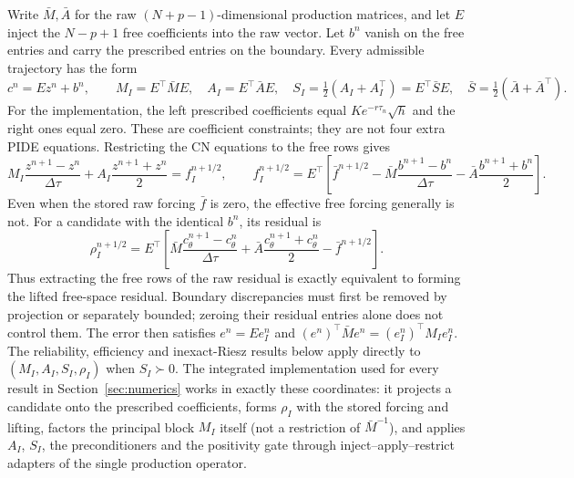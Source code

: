 \documentclass[11pt]{amsart}
\theoremstyle{remark}
\begin{document}
Write $\bar M,\bar A$ for the raw $(N+p-1)$-dimensional production matrices,
and let $E$ inject the $N-p+1$ free coefficients into the raw vector.
Let $b^n$ vanish on the free entries and carry the prescribed entries on the
boundary. Every admissible trajectory has the form
\[
 c^n=Ez^n+b^n,\qquad
 M_I=E^\top\bar M E,\quad A_I=E^\top\bar A E,\quad
 S_I=\tfrac12(A_I+A_I^\top)=E^\top\bar S E,
 \quad \bar S=\tfrac12(\bar A+\bar A^\top).
\]
For the implementation, the left prescribed coefficients equal
$K e^{-r\tau_n}\sqrt h$ and the right ones equal zero. These are
coefficient constraints; they are not four extra PIDE equations.
Restricting the CN equations to the free rows gives
\begin{equation}
 M_I\frac{z^{n+1}-z^n}{\Delta\tau}
 +A_I\frac{z^{n+1}+z^n}{2}=f_I^{n+1/2},\qquad
 f_I^{n+1/2}=E^\top\!\left[\bar f^{n+1/2}
 -\bar M\frac{b^{n+1}-b^n}{\Delta\tau}
 -\bar A\frac{b^{n+1}+b^n}{2}\right].
 \label{eq:constrained-cn}
\end{equation}
Even when the stored raw forcing $\bar f$ is zero, the effective free forcing
generally is not. For a candidate with the identical $b^n$, its residual is
\begin{equation}
 \rho_I^{n+1/2}=E^\top\!\left[\bar M\frac{c_\theta^{n+1}-c_\theta^n}{\Delta\tau}
 +\bar A\frac{c_\theta^{n+1}+c_\theta^n}{2}-\bar f^{n+1/2}\right].
 \label{eq:constrained-residual}
\end{equation}
Thus extracting the free rows of the raw residual is exactly equivalent to
forming the lifted free-space residual. Boundary discrepancies must first be
removed by projection or separately bounded; zeroing their residual entries
alone does not control them. The error then satisfies $e^n=Ee_I^n$ and
$(e^n)^\top\bar M e^n=(e_I^n)^\top M_I e_I^n$.
The reliability, efficiency and inexact-Riesz results below apply directly to
$(M_I,A_I,S_I,\rho_I)$ when $S_I\succ0$. The integrated implementation used
for every result in Section~\ref{sec:numerics} works in exactly these
coordinates: it projects a candidate onto the prescribed coefficients, forms
$\rho_I$ with the stored forcing and lifting, factors the principal block
$M_I$ itself (not a restriction of $\bar M^{-1}$), and applies $A_I$, $S_I$,
the preconditioners and the positivity gate through inject--apply--restrict
adapters of the single production operator.
\end{document}
